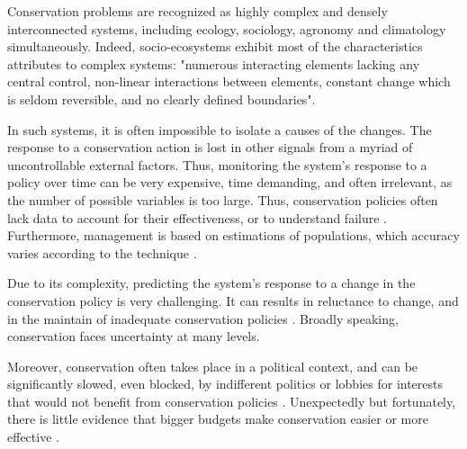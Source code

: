 \documentclass[12pt,a4paper]{article}
\begin{document}
Conservation problems are recognized as highly complex and densely interconnected systems, including ecology, sociology, agronomy and climatology simultaneously.
Indeed, socio-ecosystems exhibit most of the characteristics \cite{game2013conservation} attributes to complex systems: "numerous interacting elements lacking any central control, non-linear interactions between elements, constant change which is seldom reversible, and no clearly defined boundaries".

In such systems, it is often impossible to isolate a causes of the changes.
The response to a conservation action is lost in other signals from a myriad of uncontrollable external factors.
Thus, monitoring the system's response to a policy over time can be very expensive, time demanding, and often irrelevant, as the number of possible variables is too large.
Thus, conservation policies often lack data to account for their effectiveness, or to understand failure \citep{keith2011uncertainty}.
Furthermore, management is based on estimations of populations, which accuracy varies according to the technique \citep{BUNNEFELD2011441}.

Due to its complexity, predicting the system's response to a change in the conservation policy is very challenging.
It can results in reluctance to change, and in the maintain of inadequate conservation policies \citep{keith2011uncertainty, peterson2005conservation}.
Broadly speaking, conservation faces uncertainty at many levels.

Moreover, conservation often takes place in a political context, and can be significantly slowed, even blocked, by indifferent politics or lobbies for interests that would not benefit from conservation policies \citep{keith2011uncertainty}.
Unexpectedly but fortunately, there is little evidence that bigger budgets make conservation easier or more effective \citep{game2013conservation}.
\end{document}
